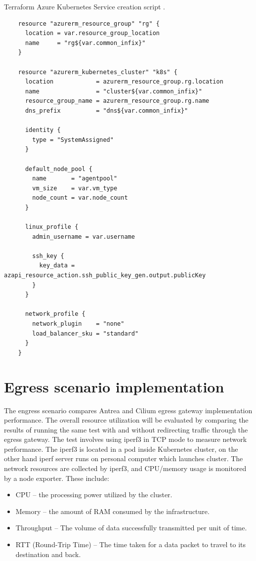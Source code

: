 \begin{listing}[htb]
  \centering
  \caption{Terraform Azure Kubernetes Service creation script \cite{AKS}.}
  \begin{verbatim}
    resource "azurerm_resource_group" "rg" {
      location = var.resource_group_location
      name     = "rg${var.common_infix}"
    }

    resource "azurerm_kubernetes_cluster" "k8s" {
      location            = azurerm_resource_group.rg.location
      name                = "cluster${var.common_infix}"
      resource_group_name = azurerm_resource_group.rg.name
      dns_prefix          = "dns${var.common_infix}"

      identity {
        type = "SystemAssigned"
      }

      default_node_pool {
        name       = "agentpool"
        vm_size    = var.vm_type
        node_count = var.node_count
      }

      linux_profile {
        admin_username = var.username

        ssh_key {
          key_data = azapi_resource_action.ssh_public_key_gen.output.publicKey
        }
      }

      network_profile {
        network_plugin    = "none"
        load_balancer_sku = "standard"
      }
    }
  \end{verbatim}
  \label{lst:terraformScript}
\end{listing}




\section{Egress scenario implementation}
\label{sec:egressImpl}


The engress scenario compares Antrea and Cilium egress gateway implementation performance. The overall resource utilization will be evaluated by comparing the results of running the same test with and without redirecting traffic through the egress gateway. The test involves using iperf3 in TCP mode to measure network performance. The iperf3 is located in a pod inside Kubernetes cluster, on the other hand iperf server runs on personal computer which launches cluster. The network resources are collected by iperf3, and CPU/memory usage is monitored by a node exporter. These include:
\begin{itemize}
  \item CPU -- the processing power utilized by the cluster.
  \item Memory -- the amount of RAM consumed by the infrastructure.
  \item Throughput -- The volume of data successfully transmitted per unit of time.
  \item RTT (Round-Trip Time) -- The time taken for a data packet to travel to its destination and back.
\end{itemize}

